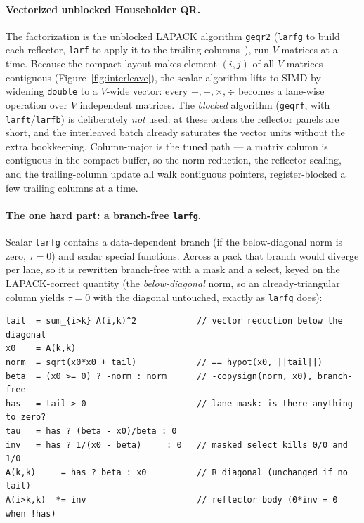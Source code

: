 \documentclass[11pt]{article}
\newcommand{\code}[1]{\texttt{#1}}
\begin{document}
\paragraph{Vectorized unblocked Householder QR.}
The factorization is the unblocked LAPACK algorithm \code{geqr2}
(\code{larfg} to build each reflector, \code{larf} to apply it to the trailing
columns~\cite{lapack-ug,golub2013}), run $V$ matrices at a time. Because the
compact layout makes element $(i,j)$ of all $V$ matrices contiguous
(Figure~\ref{fig:interleave}), the scalar algorithm lifts to SIMD by widening
\code{double} to a $V$-wide vector: every $+,-,\times,\div$ becomes a lane-wise
operation over $V$ independent matrices. The \emph{blocked} algorithm
(\code{geqrf}, with \code{larft}/\code{larfb}) is deliberately \emph{not} used:
at these orders the reflector panels are short, and the interleaved batch already
saturates the vector units without the extra bookkeeping. Column-major is the
tuned path --- a matrix column is contiguous in the compact buffer, so the norm
reduction, the reflector scaling, and the trailing-column update all walk
contiguous pointers, register-blocked a few trailing columns at a time.

\paragraph{The one hard part: a branch-free \code{larfg}.}
Scalar \code{larfg} contains a data-dependent branch (if the below-diagonal norm
is zero, $\tau=0$) and scalar special functions. Across a pack that branch would
diverge per lane, so it is rewritten branch-free with a mask and a select, keyed
on the LAPACK-correct quantity (the \emph{below-diagonal} norm, so an
already-triangular column yields $\tau=0$ with the diagonal untouched, exactly as
\code{larfg} does):

\begin{lstlisting}
tail  = sum_{i>k} A(i,k)^2            // vector reduction below the diagonal
x0    = A(k,k)
norm  = sqrt(x0*x0 + tail)            // == hypot(x0, ||tail||)
beta  = (x0 >= 0) ? -norm : norm      // -copysign(norm, x0), branch-free
has   = tail > 0                      // lane mask: is there anything to zero?
tau   = has ? (beta - x0)/beta : 0
inv   = has ? 1/(x0 - beta)     : 0   // masked select kills 0/0 and 1/0
A(k,k)     = has ? beta : x0          // R diagonal (unchanged if no tail)
A(i>k,k)  *= inv                      // reflector body (0*inv = 0 when !has)
\end{lstlisting}
\end{document}
